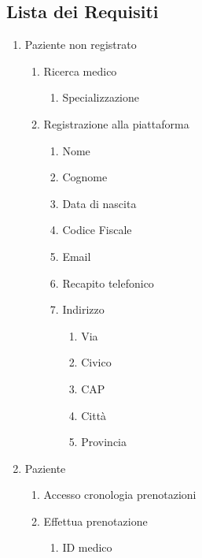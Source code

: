 \documentclass[12pt]{report}
\begin{document}
    \subsection{Lista dei Requisiti}
    \begin{enumerate}
        \item Paziente non registrato
            \begin{enumerate}
                \item Ricerca medico
                    \begin{enumerate}
                        \item Specializzazione
                    \end{enumerate}
                \item Registrazione alla piattaforma
                    \begin{enumerate}
                        \item Nome
                        \item Cognome
                        \item Data di nascita
                        \item Codice Fiscale
                        \item Email
                        \item Recapito telefonico
                        \item Indirizzo
                            \begin{enumerate}
                                \item Via
                                \item Civico
                                \item CAP
                                \item Città
                                \item Provincia
                            \end{enumerate}
                    \end{enumerate}
            \end{enumerate}
        \item Paziente
            \begin{enumerate}
                \item Accesso cronologia prenotazioni
                \item Effettua prenotazione
                    \begin{enumerate}
                        \item ID medico

\end{enumerate}
\end{enumerate}
\end{enumerate}
\end{document}
